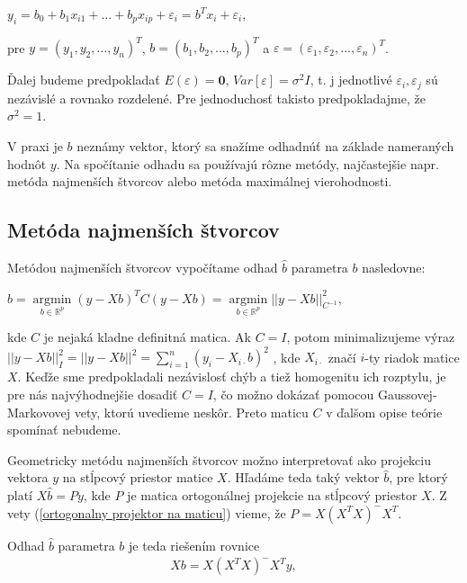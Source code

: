 \begin{center}
$
y_i = b_0 + b_1 x_{i1} + … + b_p x_{ip} + {\varepsilon}_i = b^T x_i + {\varepsilon}_i
$,
\end{center}

pre $y = (y_1, y_2, \ldots, y_n)^T$, $b = (b_1, b_2, \ldots, b_p)^T$ a $\varepsilon = ({\varepsilon}_1, {\varepsilon}_2, \ldots, {\varepsilon}_n)^T$.

Ďalej budeme predpokladať $E(\varepsilon) = \textbf{0}$, $Var[\varepsilon] = {\sigma}^2 I$,
t. j jednotlivé ${\varepsilon}_i, {\varepsilon}_j$ sú nezávislé a rovnako rozdelené.
Pre jednoduchosť takisto predpokladajme, že ${\sigma}^2 = 1$.

V praxi je $b$ neznámy vektor, ktorý sa snažíme odhadnúť na základe nameraných hodnôt $y$.
Na spočítanie odhadu sa používajú rôzne metódy, najčastejšie napr. metóda najmenších štvorcov alebo metóda maximálnej vierohodnosti.

\subsection{Metóda najmenších štvorcov}

Metódou najmenších štvorcov vypočítame odhad $\hat{b}$ parametra $b$ nasledovne:

\begin{center}
$
\hat{b} = \underset{b \in \mathbb{R}^{p}}{\operatorname{arg min}} (y - Xb)^T C (y - Xb) =
\underset{b \in \mathbb{R}^{p}}{\operatorname{arg min}} ||y - Xb||_{C^{-1}}^2
$,
\end{center}

kde $C$ je nejaká kladne definitná matica. 
Ak $C = I$, potom minimalizujeme výraz
$||y - Xb||_I^2 = ||y - Xb||^2 = \sum_{i=1}^n (y_i - X_{i \cdot } b)^2$
, kde $X_{i \cdot }$ značí $i$-ty riadok matice $X$.
Keďže sme predpokladali nezávislosť chýb a tiež homogenitu ich rozptylu, je pre nás najvýhodnejšie dosadiť $C = I$,
čo možno dokázať pomocou Gaussovej-Markovovej vety, ktorú uvedieme neskôr.
Preto maticu $C$ v ďalšom opise teórie spomínať nebudeme.

Geometricky metódu najmenších štvorcov možno interpretovať ako projekciu vektora $y$ 
na stĺpcový priestor matice $X$. Hľadáme teda taký vektor $\hat{b}$, 
pre ktorý platí $X \hat{b} = Py$, kde $P$ je matica ortogonálnej projekcie na stĺpcový priestor $X$. 
Z vety (\ref{ortogonalny projektor na maticu}) vieme, že $P = X (X^T X)^- X^T$.

Odhad $\hat{b}$ parametra $b$ je teda riešením rovnice
\begin{align}
\label{least squares solution}
X b =  X (X^T X)^- X^T y,
\end{align}

